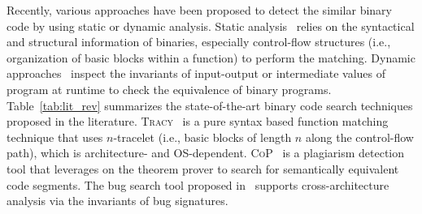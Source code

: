 Recently, various approaches have been proposed to detect the similar binary code by using static or dynamic analysis.
Static analysis~\cite{DBLP:conf/pldi/DavidY14,saebjornsen2009detecting,luo2014semantics,DBLP:conf/sp/PewnyGGRH15} relies on the syntactical and structural information of binaries, especially control-flow structures (i.e., organization of basic blocks within a function) to perform the matching. %
Dynamic approaches~\cite{DBLP:conf/issta/JiangS09,DBLP:conf/asplos/Schkufza0A13,DBLP:conf/icse/JhiWJZLW11,DBLP:conf/uss/EgeleWCB14,egele2014blanket} inspect the invariants of input-output or intermediate values of program at runtime to check the equivalence of binary programs.
Table~\ref{tab:lit_rev} summarizes the state-of-the-art binary code search techniques proposed in the literature. \textsc{\small Tracy}~\cite{DBLP:conf/pldi/DavidY14} is a pure syntax based function matching technique
that uses $n$-tracelet (i.e., basic blocks of length $n$ along the control-flow path), which is architecture- and OS-dependent. \textsc{\small CoP}~\cite{luo2014semantics} is a plagiarism detection tool that leverages on the theorem prover to search for semantically equivalent code segments.
The bug search tool proposed in~\cite{DBLP:conf/sp/PewnyGGRH15} supports cross-architecture analysis via the invariants of bug signatures.
